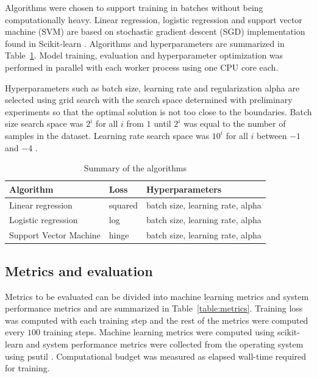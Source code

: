 Algorithms were chosen to support training in batches without being computationally heavy. Linear regression, logistic regression and support vector machine (SVM) are based on stochastic gradient descent (SGD) implementation found in Scikit-learn \parencite{pedregosaScikitlearnMachineLearning2011}. Algorithms and hyperparameters are summarized in Table~\ref{table:algorithms}. Model training, evaluation and hyperparameter optimization was performed in parallel with each worker process using one CPU core each.

Hyperparameters such as batch size, learning rate and regularization alpha are selected using grid search with the search space determined with preliminary experiments so that the optimal solution is not too close to the boundaries. Batch size search space was $2^i$ for all $i$ from $1$ until $2^i$ was equal to the number of samples in the dataset. Learning rate search space was $10^i$ for all $i$ between $-1$ and $-4$ .



\begin{table}[h]
    \centering
    \begin{tabular}{lll}
        \toprule
        Algorithm              & Loss    & Hyperparameters                  \\
        \midrule
        Linear regression      & squared & batch size, learning rate, alpha \\
        Logistic regression    & log     & batch size, learning rate, alpha \\
        Support Vector Machine & hinge   & batch size, learning rate, alpha \\
        \bottomrule
    \end{tabular}
    \caption{Summary of the algorithms}
    \label{table:algorithms}
\end{table}

\subsection{Metrics and evaluation}
Metrics to be evaluated can be divided into machine learning metrics and system performance metrics and are summarized in Table~\ref{table:metrics}. Training loss was computed with each training step and the rest of the metrics were computed every $100$ training steps. Machine learning metrics were computed using scikit-learn \parencite{pedregosaScikitlearnMachineLearning2011} and system performance metrics were collected from the operating system using psutil \parencite{rodolaGiampaoloPsutil2023}. Computational budget was measured as elapsed wall-time required for training.


